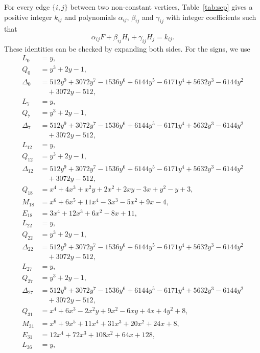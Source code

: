 \documentclass[11pt]{article}
\begin{document}
For every edge $\{i,j\}$ between two non-constant vertices, Table~\ref{tab:sep} gives a positive integer $k_{ij}$ and polynomials $\alpha_{ij}$, $\beta_{ij}$ and $\gamma_{ij}$ with integer coefficients such that
\begin{equation}\label{eq:sep}
\alpha_{ij}F+\beta_{ij}H_i+\gamma_{ij}H_j=k_{ij}.
\end{equation}
These identities can be checked by expanding both sides.
For the signs, we use
\begin{align*}
L_{0}&=y,\\
Q_{0}&=y^{3}+2y-1,\\
\Delta_{0}&=512y^{9}+3072y^{7}-1536y^{6}+6144y^{5}-6171y^{4}+5632y^{3}-6144y^{2}\\
&\quad+3072y-512,\\
L_{7}&=y,\\
Q_{7}&=y^{3}+2y-1,\\
\Delta_{7}&=512y^{9}+3072y^{7}-1536y^{6}+6144y^{5}-6171y^{4}+5632y^{3}-6144y^{2}\\
&\quad+3072y-512,\\
L_{12}&=y,\\
Q_{12}&=y^{3}+2y-1,\\
\Delta_{12}&=512y^{9}+3072y^{7}-1536y^{6}+6144y^{5}-6171y^{4}+5632y^{3}-6144y^{2}\\
&\quad+3072y-512,\\
Q_{18}&=x^{4}+4x^{3}+x^{2}y+2x^{2}+2xy-3x+y^{2}-y+3,\\
M_{18}&=x^{6}+6x^{5}+11x^{4}-3x^{3}-5x^{2}+9x-4,\\
E_{18}&=3x^{4}+12x^{3}+6x^{2}-8x+11,\\
L_{22}&=y,\\
Q_{22}&=y^{3}+2y-1,\\
\Delta_{22}&=512y^{9}+3072y^{7}-1536y^{6}+6144y^{5}-6171y^{4}+5632y^{3}-6144y^{2}\\
&\quad+3072y-512,\\
L_{27}&=y,\\
Q_{27}&=y^{3}+2y-1,\\
\Delta_{27}&=512y^{9}+3072y^{7}-1536y^{6}+6144y^{5}-6171y^{4}+5632y^{3}-6144y^{2}\\
&\quad+3072y-512,\\
Q_{31}&=x^{4}+6x^{3}-2x^{2}y+9x^{2}-6xy+4x+4y^{2}+8,\\
M_{31}&=x^{6}+9x^{5}+11x^{4}+31x^{3}+20x^{2}+24x+8,\\
E_{31}&=12x^{4}+72x^{3}+108x^{2}+64x+128,\\
L_{36}&=y,\\

\end{align*}
\end{document}
